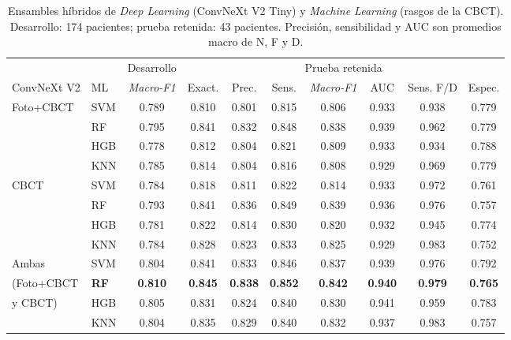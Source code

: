 \documentclass[runningheads]{llncs}
\begin{document}
\begin{table}[!t]
\centering
\caption{Ensambles híbridos de \textit{Deep Learning} (ConvNeXt V2 Tiny)
y \textit{Machine Learning} (rasgos de la CBCT). Desarrollo: 174
pacientes; prueba retenida: 43 pacientes. Precisión, sensibilidad y AUC
son promedios macro de N, F y D.}
\label{tab:ensambles}
\scriptsize
\setlength{\tabcolsep}{3pt}
\setlength{\aboverulesep}{0pt}
\setlength{\belowrulesep}{0pt}
\renewcommand{\arraystretch}{1.12}
\begin{tabular}{l|l|c|c|c|c|c|c|c|c}
\toprule
\multicolumn{2}{l|}{} & Desarrollo & \multicolumn{7}{c}{Prueba retenida} \\
\cline{3-10}
ConvNeXt V2 & ML & \textit{Macro-F1} & Exact. & Prec. & Sens. & \textit{Macro-F1} & AUC & Sens. F/D & Espec. \\
\midrule
Foto+CBCT & SVM & 0.789 & 0.810 & 0.801 & 0.815 & 0.806 & 0.933 & 0.938 & 0.779 \\ \cline{2-10}
          & RF  & 0.795 & 0.841 & 0.832 & 0.848 & 0.838 & 0.939 & 0.962 & 0.779 \\ \cline{2-10}
          & HGB & 0.778 & 0.812 & 0.804 & 0.821 & 0.809 & 0.933 & 0.934 & 0.788 \\ \cline{2-10}
          & KNN & 0.785 & 0.814 & 0.804 & 0.816 & 0.808 & 0.929 & 0.969 & 0.779 \\
\midrule
CBCT      & SVM & 0.784 & 0.818 & 0.811 & 0.822 & 0.814 & 0.933 & 0.972 & 0.761 \\ \cline{2-10}
          & RF  & 0.793 & 0.841 & 0.836 & 0.849 & 0.839 & 0.936 & 0.976 & 0.757 \\ \cline{2-10}
          & HGB & 0.781 & 0.822 & 0.814 & 0.830 & 0.820 & 0.932 & 0.945 & 0.774 \\ \cline{2-10}
          & KNN & 0.784 & 0.828 & 0.823 & 0.833 & 0.825 & 0.929 & 0.983 & 0.752 \\
\midrule
Ambas     & SVM & 0.804 & 0.841 & 0.833 & 0.846 & 0.837 & 0.939 & 0.976 & 0.792 \\ \cline{2-10}
(Foto+CBCT & \textbf{RF} & \textbf{0.810} & \textbf{0.845} & \textbf{0.838} & \textbf{0.852} & \textbf{0.842} & \textbf{0.940} & \textbf{0.979} & \textbf{0.765} \\ \cline{2-10}
y CBCT)   & HGB & 0.805 & 0.831 & 0.824 & 0.840 & 0.830 & 0.941 & 0.959 & 0.783 \\ \cline{2-10}
          & KNN & 0.804 & 0.835 & 0.829 & 0.840 & 0.832 & 0.937 & 0.983 & 0.757 \\
\bottomrule
\end{tabular}

\end{table}
\end{document}
